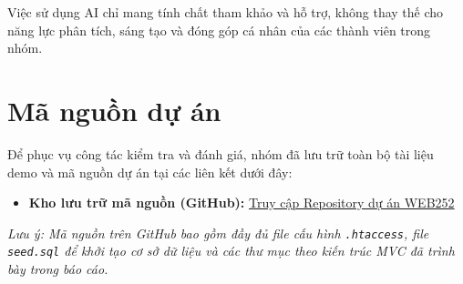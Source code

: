 \noindent Việc sử dụng AI chỉ mang tính chất tham khảo và hỗ trợ, không thay thế cho năng lực phân tích, sáng tạo và đóng góp cá nhân của các thành viên trong nhóm.

\section{Mã nguồn dự án}

Để phục vụ công tác kiểm tra và đánh giá, nhóm đã lưu trữ toàn bộ tài liệu demo và mã nguồn dự án tại các liên kết dưới đây:

\begin{itemize}
    \item \textbf{Kho lưu trữ mã nguồn (GitHub):} \href{https://github.com/NghiaNguyenhk2005/WEB252}{Truy cập Repository dự án WEB252}
\end{itemize}

\textit{Lưu ý: Mã nguồn trên GitHub bao gồm đầy đủ file cấu hình \texttt{.htaccess}, file \texttt{seed.sql} để khởi tạo cơ sở dữ liệu và các thư mục theo kiến trúc MVC đã trình bày trong báo cáo.}